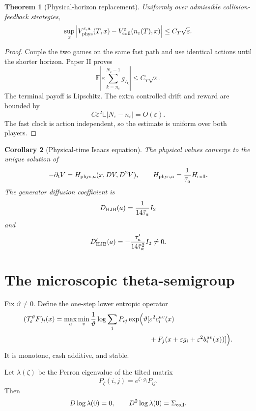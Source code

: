\documentclass[11pt,reqno]{amsart}
\newtheorem{theorem}{Theorem}[section]
\newtheorem{corollary}[theorem]{Corollary}
\theoremstyle{definition}
\theoremstyle{remark}
\newcommand{\E}{\mathbb E}
\newcommand{\abs}[1]{\left\lvert #1\right\rvert}
\begin{document}
\begin{theorem}[Physical-horizon replacement]\label{thm:physical-replacement}
Uniformly over admissible collision-feedback strategies,
\[
 \sup_x
 \abs{
 V_{\rm phys}^{\varepsilon,a}(T,x)
 -
 V_{\rm coll}^{\varepsilon}
 (n_\varepsilon(T),x)}
 \le C_T\sqrt\varepsilon.
\]
\end{theorem}

\begin{proof}
Couple the two games on the same fast path and use identical actions until the
shorter horizon.  Paper II proves
\[
 \E\abs{
 \varepsilon\sum_{k=n_\varepsilon}^{N_\varepsilon-1}g_{I_k}}
 \le C_T\sqrt\varepsilon.
\]
The terminal payoff is Lipschitz.  The extra controlled drift and reward are
bounded by
\[
 C\varepsilon^2\E\abs{N_\varepsilon-n_\varepsilon}
 =O(\varepsilon).
\]
The fast clock is action independent, so the estimate is uniform over both
players.
\end{proof}

\begin{corollary}[Physical-time Isaacs equation]\label{cor:physical-hjb}
The physical values converge to the unique solution of
\begin{equation}\label{eq:physical-pde}
 -\partial_tV
 =
 H_{{\rm phys},a}(x,DV,D^2V),
 \qquad
 H_{{\rm phys},a}
 =\frac1{\bar\tau_a}H_{\rm coll}.
\end{equation}
The generator diffusion coefficient is
\[
 D_{\rm HJB}(a)=\frac1{14\bar\tau_a}I_2
\]
and
\[
 D_{\rm HJB}'(a)
 =-\frac{\bar\tau_a'}{14\bar\tau_a^2}I_2\ne0.
\]
\end{corollary}

\section{The microscopic theta-semigroup}\label{sec:theta}

Fix $\vartheta\ne0$.  Define the one-step lower entropic operator
\begin{equation}\label{eq:theta-step}
\begin{aligned}
 (\mathcal T_\varepsilon^\vartheta F)_i(x)
 =
 \max_u\min_v\frac1\vartheta\log
 \sum_jP_{ij}\exp\Bigl(\vartheta[
 &\varepsilon^2c_i^{uv}(x)\\
 &+F_j(x+\varepsilon g_i+\varepsilon^2b_i^{uv}(x))
 ]\Bigr).
\end{aligned}
\end{equation}
It is monotone, cash additive, and stable.

Let $\lambda(\zeta)$ be the Perron eigenvalue of the tilted matrix
\[
 P_\zeta(i,j)=e^{\zeta\cdot g_i}P_{ij}.
\]
Then
\[
 D\log\lambda(0)=0,\qquad
 D^2\log\lambda(0)=\Sigma_{\rm coll}.
\]
\end{document}
